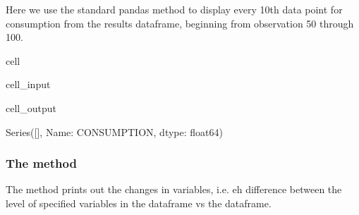 \documentclass[letterpaper,10pt,english]{jupyterBook}
\begin{document}
\sphinxAtStartPar
Here we use the standard pandas  method to display every 10th data point for consumption from the results dataframe, beginning from observation 50 through 100.

\begin{sphinxuseclass}{cell}\begin{sphinxVerbatimInput}

\begin{sphinxuseclass}{cell_input}
\begin{sphinxVerbatim}[commandchars=\\\{\}]
\PYG{p}{[}\PYG{p}{]}
\end{sphinxVerbatim}

\end{sphinxuseclass}\end{sphinxVerbatimInput}
\begin{sphinxVerbatimOutput}

\begin{sphinxuseclass}{cell_output}
\begin{sphinxVerbatim}[commandchars=\\\{\}]
Series([], Name: CONSUMPTION, dtype: float64)
\end{sphinxVerbatim}

\end{sphinxuseclass}\end{sphinxVerbatimOutput}

\end{sphinxuseclass}

\subsubsection{The  method}
\label{\detokenize{content/03_Installation/TestingModelFlow:the-dif-df-method}}
\sphinxAtStartPar
The  method prints out the changes in variables, i.e. eh difference between the level of specified  variables in the  dataframe vs the  dataframe.
\end{document}
